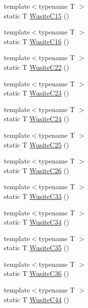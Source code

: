 \begin{DoxyCompactItemize}
\item 
{\footnotesize template$<$typename T $>$ }\\static T \mbox{\hyperlink{namespacempc_1_1data_afdfdf0a397941120f097f3200b67c374}{Wusite\+C15}} ()
\item 
{\footnotesize template$<$typename T $>$ }\\static T \mbox{\hyperlink{namespacempc_1_1data_a87f4de9ce302d78dc4ea804452323010}{Wusite\+C16}} ()
\item 
{\footnotesize template$<$typename T $>$ }\\static T \mbox{\hyperlink{namespacempc_1_1data_ad52e88ae03b4503f0cf51baab30b0fb6}{Wusite\+C22}} ()
\item 
{\footnotesize template$<$typename T $>$ }\\static T \mbox{\hyperlink{namespacempc_1_1data_ad72934051064d47b386d6600a78cc145}{Wusite\+C23}} ()
\item 
{\footnotesize template$<$typename T $>$ }\\static T \mbox{\hyperlink{namespacempc_1_1data_ad3d5470f37f88a0e3c9a2e8886ea9dc1}{Wusite\+C24}} ()
\item 
{\footnotesize template$<$typename T $>$ }\\static T \mbox{\hyperlink{namespacempc_1_1data_af0ff5e88f772b787b841324f541eef2d}{Wusite\+C25}} ()
\item 
{\footnotesize template$<$typename T $>$ }\\static T \mbox{\hyperlink{namespacempc_1_1data_a5c237688382c9d0f58943a2ed26e595f}{Wusite\+C26}} ()
\item 
{\footnotesize template$<$typename T $>$ }\\static T \mbox{\hyperlink{namespacempc_1_1data_abcf7e4264eb30118f66f7f0a32967ef4}{Wusite\+C33}} ()
\item 
{\footnotesize template$<$typename T $>$ }\\static T \mbox{\hyperlink{namespacempc_1_1data_a7d074c53b07a1cb7cc6e14acaa44d2a0}{Wusite\+C34}} ()
\item 
{\footnotesize template$<$typename T $>$ }\\static T \mbox{\hyperlink{namespacempc_1_1data_a821385997f4e474fe0f5c33d5c99c26f}{Wusite\+C35}} ()
\item 
{\footnotesize template$<$typename T $>$ }\\static T \mbox{\hyperlink{namespacempc_1_1data_a2e67d60c4ab401d66638b62b681fd1bc}{Wusite\+C36}} ()
\item 
{\footnotesize template$<$typename T $>$ }\\static T \mbox{\hyperlink{namespacempc_1_1data_ab6bc5ae1ba48e452df944f27426d5100}{Wusite\+C44}} ()

\end{DoxyCompactItemize}
